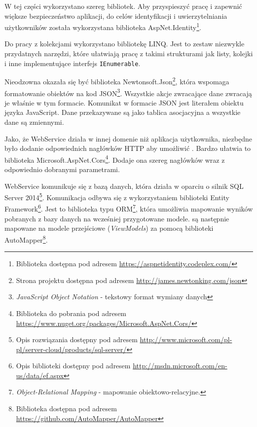 \documentclass{book}
\begin{document}
		W tej części wykorzystano szereg bibliotek. Aby przyspieszyć pracę i zapewnić większe bezpieczeństwo aplikacji, do celów identyfikacji i uwierzytelniania użytkowników została wykorzystana biblioteka AspNet.Identity\footnote{Biblioteka dostępna pod adresem \url{https://aspnetidentity.codeplex.com/}}.
		
		Do pracy z kolekcjami wykorzystano bibliotekę LINQ. Jest to zestaw niezwykle przydatnych narzędzi, które ułatwiają pracę z takimi strukturami jak listy, kolejki i inne implementujące interfejs \texttt{IEnumerable}.
		
		Nieodzowna okazała się być biblioteka Newtonsoft.Json\footnote{Strona projektu dostępna pod adresem \url{http://james.newtonking.com/json}}, która wspomaga formatowanie obiektów na kod JSON\footnote{\emph{JavaScript Object Notation} - tekstowy format wymiany danych}. Wszystkie akcje zwracające dane zwracają je właśnie w tym formacie. Komunikat w formacie JSON jest literałem obiektu języka JavaScript. Dane przekazywane są jako tablica asocjacyjna a wszystkie dane są zmiennymi.
		
		Jako, że WebService działa w innej domenie niż aplikacja użytkownika, niezbędne było dodanie odpowiednich nagłówków HTTP aby umożliwić . Bardzo ułatwia to biblioteka Microsoft.AspNet.Cors\footnote{Biblioteka do pobrania pod adresem \url{https://www.nuget.org/packages/Microsoft.AspNet.Cors/}}. Dodaje ona szereg nagłówków wraz z odpowiednio dobranymi parametrami.
		
		WebService komunikuje się z bazą danych, która działa w oparciu o silnik SQL Server 2014\footnote{Opis rozwiązania dostępny pod adresem \url{http://www.microsoft.com/pl-pl/server-cloud/products/sql-server/}}. Komunikacja odbywa się z wykorzystaniem biblioteki Entity Framework\footnote{Opis biblioteki dostępny pod adresem \url{http://msdn.microsoft.com/en-us/data/ef.aspx}}. Jest to biblioteka typu ORM\footnote{\emph{Object-Relational Mapping} - mapowanie obiektowo-relacyjne. },
		która umożliwia mapowanie wyników pobranych z bazy danych na wcześniej przygotowane modele.  są następnie mapowane na modele przejściowe (\emph{ViewModels}) za pomocą biblioteki AutoMapper\footnote{Biblioteka dostępna pod adresem \url{https://github.com/AutoMapper/AutoMapper}}.
		
\end{document}
